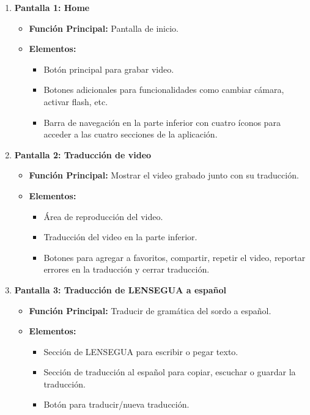 \begin{enumerate}
    \item \textbf{Pantalla 1: Home}
    \begin{itemize}
        \item \textbf{Función Principal:} Pantalla de inicio.
        \item \textbf{Elementos:}
        \begin{itemize}
            \item Botón principal para grabar video.
            \item Botones adicionales para funcionalidades como cambiar cámara, activar flash, etc.
            \item Barra de navegación en la parte inferior con cuatro íconos para acceder a las cuatro secciones de la aplicación.
        \end{itemize}
    \end{itemize}

    \item \textbf{Pantalla 2: Traducción de video}
    \begin{itemize}
        \item \textbf{Función Principal:} Mostrar el video grabado junto con su traducción.
        \item \textbf{Elementos:}
        \begin{itemize}
            \item Área de reproducción del video.
            \item Traducción del video en la parte inferior.
            \item Botones para agregar a favoritos, compartir, repetir el video, reportar errores en la traducción y cerrar traducción.
        \end{itemize}
    \end{itemize}

    \item \textbf{Pantalla 3: Traducción de LENSEGUA a español}
    \begin{itemize}
        \item \textbf{Función Principal:} Traducir de gramática del sordo a español.
        \item \textbf{Elementos:}
        \begin{itemize}
            \item Sección de LENSEGUA para escribir o pegar texto.
            \item Sección de traducción al español para copiar, escuchar o guardar la traducción.
            \item Botón para traducir/nueva traducción.
        \end{itemize}
    \end{itemize}


\end{enumerate}
